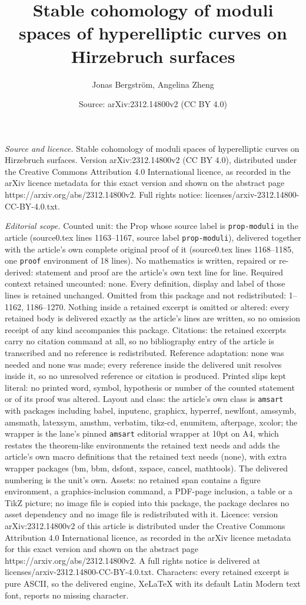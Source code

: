 \documentclass[10pt,a4paper]{amsart}
\title[Stable cohomology of moduli spaces of hyperelliptic curves o]{Stable cohomology of moduli spaces of hyperelliptic curves on Hirzebruch surfaces}
\author{Jonas Bergstr\"om, Angelina Zheng}
\date{Source: arXiv:2312.14800v2 (CC BY 4.0)}
\begin{document}
\maketitle

\noindent\emph{Source and licence.} Stable cohomology of moduli spaces of hyperelliptic curves on Hirzebruch surfaces. Version arXiv:2312.14800v2 (CC BY 4.0), distributed under the Creative Commons Attribution 4.0 International licence, as recorded in the arXiv licence metadata for this exact version and shown on the abstract page https://arxiv.org/abs/2312.14800v2. Full rights notice: licenses/arxiv-2312.14800-CC-BY-4.0.txt.\par\smallskip

\noindent\textit{Editorial scope.} Counted unit: the Prop whose source label is \texttt{prop-moduli} in the article (source0.tex lines 1163--1167, source label \texttt{prop-moduli}), delivered together with the article's own complete original proof of it (source0.tex lines 1168--1185, one \texttt{proof} environment of 18 lines). No mathematics is written, repaired or re-derived: statement and proof are the article's own text line for line. Required context retained uncounted: none. Every definition, display and label of those lines is retained unchanged. Omitted from this package and not redistributed: 1--1162, 1186--1270. Nothing inside a retained excerpt is omitted or altered: every retained body is delivered exactly as the article's lines are written, so no omission receipt of any kind accompanies this package. Citations: the retained excerpts carry no citation command at all, so no bibliography entry of the article is transcribed and no reference is redistributed. Reference adaptation: none was needed and none was made; every reference inside the delivered unit resolves inside it, so no unresolved reference or citation is produced. Printed slips kept literal: no printed word, symbol, hypothesis or number of the counted statement or of its proof was altered. Layout and class: the article's own class is \texttt{amsart} with packages including babel, inputenc, graphicx, hyperref, newlfont, amssymb, amsmath, latexsym, amsthm, verbatim, tikz-cd, enumitem, afterpage, xcolor; the wrapper is the lane's pinned \texttt{amsart} editorial wrapper at 10pt on A4, which restates the theorem-like environments the retained text needs and adds the article's own macro definitions that the retained text needs (none), with extra wrapper packages (bm, bbm, dsfont, xspace, cancel, mathtools). The delivered numbering is the unit's own. Assets: no retained span contains a figure environment, a graphics-inclusion command, a PDF-page inclusion, a table or a TikZ picture; no image file is copied into this package, the package declares no asset dependency and no image file is redistributed with it. Licence: version arXiv:2312.14800v2 of this article is distributed under the Creative Commons Attribution 4.0 International licence, as recorded in the arXiv licence metadata for this exact version and shown on the abstract page https://arxiv.org/abs/2312.14800v2. A full rights notice is delivered at licenses/arxiv-2312.14800-CC-BY-4.0.txt. Characters: every retained excerpt is pure ASCII, so the delivered engine, XeLaTeX with its default Latin Modern text font, reports no missing character.
\end{document}
